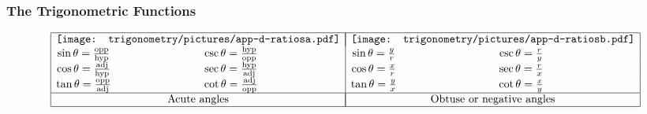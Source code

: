 \begin{frame}
\frametitle{The Trigonometric Functions}
\[
\begin{array}{|cc|cc|}
\hline
\multicolumn{2}{|c|}{%
\texttt{[image: trigonometry/pictures/app-d-ratiosa.pdf]}%
}&%
\multicolumn{2}{|c|}{%
\texttt{[image: trigonometry/pictures/app-d-ratiosb.pdf]}%
}\\%
\sin \theta = \frac{\textrm{opp}}{\textrm{hyp}} &
\csc \theta = \frac{\textrm{hyp}}{\textrm{opp}} &
\sin \theta = \frac{ y}{ r} &
\csc \theta = \frac{ r}{ y} \\
\cos \theta = \frac{\textrm{adj}}{\textrm{hyp}} &
\sec \theta = \frac{\textrm{hyp}}{\textrm{adj}} &
\cos \theta = \frac{ x}{ r} &
\sec \theta = \frac{ r}{ x} \\
\tan \theta = \frac{\textrm{opp}}{\textrm{adj}} &
\cot \theta = \frac{\textrm{adj}}{\textrm{opp}} &
\tan \theta = \frac{ y}{ x} &
\cot \theta = \frac{ x}{ y} \\
\hline
\multicolumn{2}{|c|}{\textrm{Acute angles}}&
\multicolumn{2}{|c|}{\textrm{Obtuse or negative angles}}\\
\hline
\end{array}
\]
\end{frame}
